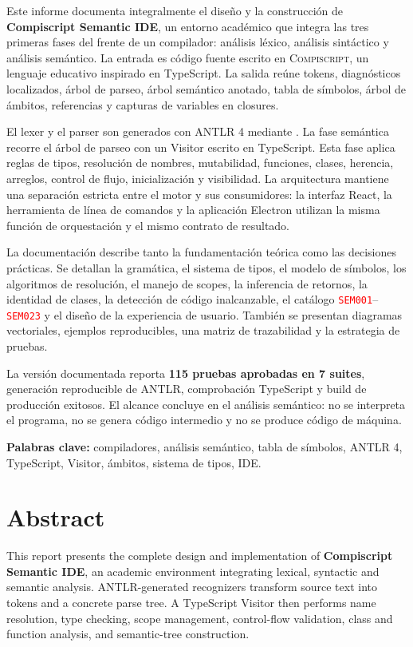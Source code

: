 \documentclass[11pt,letterpaper,oneside]{report}
\newcommand{\archivo}[1]{\path{#1}}
\newcommand{\diag}[1]{\textcolor{red}{\texttt{#1}}}
\newcommand{\Compiscript}{\textsc{Compiscript}}
\newcommand{\ANTLR}{ANTLR 4}
\begin{document}
Este informe documenta integralmente el diseño y la construcción de
\textbf{Compiscript Semantic IDE}, un entorno académico que integra las tres primeras
fases del frente de un compilador: análisis léxico, análisis sintáctico y análisis
semántico. La entrada es código fuente escrito en \Compiscript, un lenguaje educativo
inspirado en TypeScript. La salida reúne tokens, diagnósticos localizados, árbol de
parseo, árbol semántico anotado, tabla de símbolos, árbol de ámbitos, referencias y
capturas de variables en closures.

El lexer y el parser son generados con \ANTLR{} mediante \archivo{antlr4ts}. La fase
semántica recorre el árbol de parseo con un Visitor escrito en TypeScript. Esta fase
aplica reglas de tipos, resolución de nombres, mutabilidad, funciones, clases,
herencia, arreglos, control de flujo, inicialización y visibilidad. La arquitectura
mantiene una separación estricta entre el motor y sus consumidores: la interfaz
React, la herramienta de línea de comandos y la aplicación Electron utilizan la
misma función de orquestación y el mismo contrato de resultado.

La documentación describe tanto la fundamentación teórica como las decisiones
prácticas. Se detallan la gramática, el sistema de tipos, el modelo de símbolos, los
algoritmos de resolución, el manejo de scopes, la inferencia de retornos, la
identidad de clases, la detección de código inalcanzable, el catálogo
\diag{SEM001}--\diag{SEM023} y el diseño de la experiencia de usuario. También se
presentan diagramas vectoriales, ejemplos reproducibles, una matriz de trazabilidad y
la estrategia de pruebas.

La versión documentada reporta \textbf{115 pruebas aprobadas en 7 suites}, generación
reproducible de ANTLR, comprobación TypeScript y build de producción exitosos. El
alcance concluye en el análisis semántico: no se interpreta el programa, no se genera
código intermedio y no se produce código de máquina.

\textbf{Palabras clave:} compiladores, análisis semántico, tabla de símbolos,
\ANTLR, TypeScript, Visitor, ámbitos, sistema de tipos, IDE.

\chapter*{Abstract}

This report presents the complete design and implementation of
\textbf{Compiscript Semantic IDE}, an academic environment integrating lexical,
syntactic and semantic analysis. ANTLR-generated recognizers transform source text
into tokens and a concrete parse tree. A TypeScript Visitor then performs name
resolution, type checking, scope management, control-flow validation, class and
function analysis, and semantic-tree construction.
\end{document}
